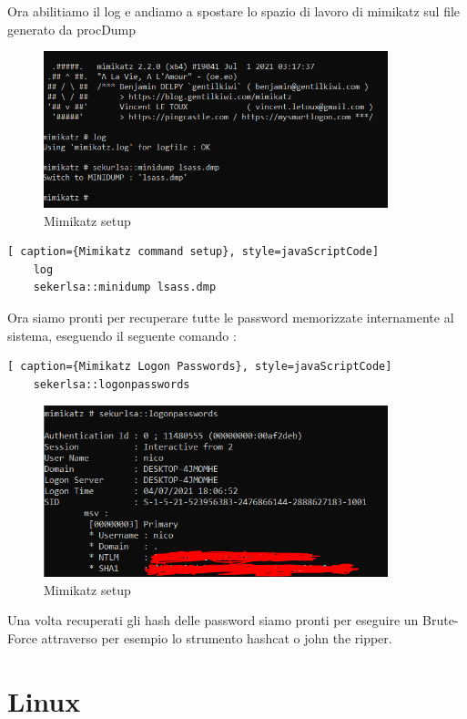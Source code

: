 Ora abilitiamo il log e andiamo a spostare lo spazio di lavoro di mimikatz sul file generato da procDump 

\begin{figure}[h!]
    \centering
    \includegraphics[width=100mm]{Immagini/2/mimikatz_2.PNG}
    \caption{Mimikatz setup}
    \label{fig:ProcDump}
\end{figure}

\begin{lstlisting}[ caption={Mimikatz command setup}, style=javaScriptCode]
    log
    sekerlsa::minidump lsass.dmp
\end{lstlisting}

Ora siamo pronti per recuperare tutte le password memorizzate internamente al sistema, eseguendo il seguente comando :

\begin{lstlisting}[ caption={Mimikatz Logon Passwords}, style=javaScriptCode]
    sekerlsa::logonpasswords
\end{lstlisting}

\begin{figure}[h!]
    \centering
    \includegraphics[width=100mm]{Immagini/2/mimikatz_3.PNG}
    \caption{Mimikatz setup}
    \label{fig:ProcDump}
\end{figure}

Una volta recuperati gli hash delle password siamo pronti per eseguire un Brute-Force attraverso per esempio lo strumento hashcat o john the ripper.


\section{Linux}

